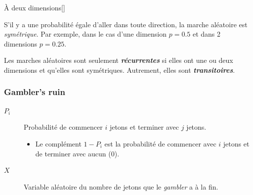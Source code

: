 \documentclass[10pt, french]{article}
\begin{document}
\begin{multicols*}{2}
\begin{definitionNOHFILL}
\begin{definitionGENERAL}{À deux dimensions}[]
\begin{center}
\end{center}
\end{definitionGENERAL}
\end{definitionNOHFILL}

\begin{definitionNOHFILLsub}
S'il y a une probabilité égale d'aller dans toute direction, la marche aléatoire est \textit{symétrique}. Par exemple, dans le cas d'une dimension $p = 0.5$ et dans 2 dimensions $p = 0.25$.
\end{definitionNOHFILLsub}

Les marches aléatoires sont seulement \textit{\textbf{récurrentes}} si elles ont une ou deux dimensions et qu'elles sont symétriques. Autrement, elles sont \textit{\textbf{transitoires}}.


\subsubsection{Gambler's ruin}
\begin{distributions}[Notation]
\begin{description}
	\item[$P_{i}$]	Probabilité de commencer $i$ jetons et terminer avec $j$ jetons.
		\begin{itemize}
		\item	Le complément $1 - P_{i}$ est la probabilité de commencer avec $i$ jetons et de terminer avec aucun ($0$).
		\end{itemize}
	\item[$X$]	Variable aléatoire du nombre de jetons que le \og \textit{gambler} \fg{} a à la fin.
\end{description}
\end{distributions}


\end{multicols*}
\end{document}

